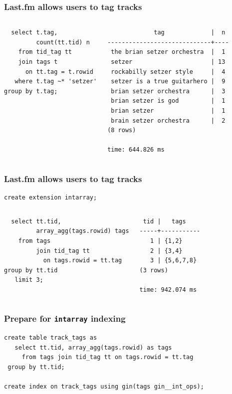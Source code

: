 \documentclass{beamer}
\begin{document}
\begin{frame}[fragile]
  \frametitle{Last.fm allows users to tag tracks}

\begin{columns}
\begin{verbatim}
  select t.tag,
         count(tt.tid) n
    from tid_tag tt
    join tags t
      on tt.tag = t.rowid
   where t.tag ~* 'setzer'
group by t.tag;
\end{verbatim}  
\begin{verbatim}
             tag             |  n 
-----------------------------+----
 the brian setzer orchestra  |  1
 setzer                      | 13
 rockabilly setzer style     |  4
 setzer is a true guitarhero |  9
 brian setzer orchestra      |  3
 brian setzer is god         |  1
 brian setzer                |  1
 brain setzer orchestra      |  2
(8 rows)

time: 644.826 ms
\end{verbatim}  
\end{columns}
\end{frame}

\begin{frame}[fragile]
  \frametitle{Last.fm allows users to tag tracks}

\begin{verbatim}
create extension intarray;
\end{verbatim}
\vfill

\begin{columns}
\begin{verbatim}
  select tt.tid,
         array_agg(tags.rowid) tags
    from tags
         join tid_tag tt
           on tags.rowid = tt.tag
group by tt.tid
   limit 3;
\end{verbatim}  
\begin{verbatim}
 tid |   tags    
-----+-----------
   1 | {1,2}
   2 | {3,4}
   3 | {5,6,7,8}
(3 rows)

time: 942.074 ms
\end{verbatim}  
\end{columns}
\end{frame}

\begin{frame}[fragile]
  \frametitle{Prepare for \texttt{intarray} indexing}

  \vfill
  
\begin{verbatim}
create table track_tags as
   select tt.tid, array_agg(tags.rowid) as tags
     from tags join tid_tag tt on tags.rowid = tt.tag
 group by tt.tid;

create index on track_tags using gin(tags gin__int_ops);
\end{verbatim}  
\end{frame}
\end{document}
